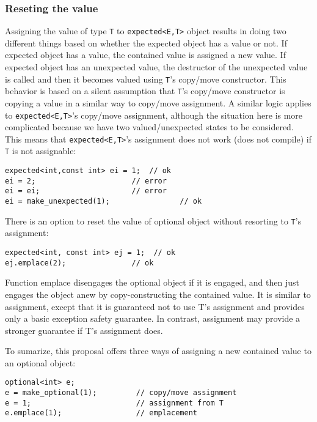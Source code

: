 \documentclass[a4paper,10pt]{article}
\newcommand{\cpp}[1]{\lstinline{#1}}
\begin{document}
\subsubsection{Reseting the value}

Assigning the value of type \cpp{T} to \cpp{expected<E,T>} object results in doing two different things based on whether the expected object has a value or not. If expected object has a value, the contained value is assigned a new value. If expected object has an unexpected value, the destructor of the unexpected value is called and then it becomes valued using \cpp{T}'s copy/move constructor. This behavior is based on a silent assumption that \cpp{T}'s copy/move constructor is copying a value in a similar way to copy/move assignment. A similar logic applies to \cpp{expected<E,T>}'s copy/move assignment, although the situation here is more complicated because we have two valued/unexpected states to be considered. This means that \cpp{expected<E,T>}'s assignment does not work (does not compile) if \cpp{T} is not assignable:

\begin{lstlisting}
expected<int,const int> ei = 1;  // ok
ei = 2;                      // error 
ei = ei;                     // error 
ei = make_unexpected(1);                // ok
\end{lstlisting}

There is an option to reset the value of optional object without resorting to \cpp{T}'s assignment:

\begin{lstlisting}
expected<int, const int> ej = 1;  // ok
ej.emplace(2);               // ok 
\end{lstlisting}

Function emplace disengages the optional object if it is engaged, and then just engages the object anew by copy-constructing the contained value. It is similar to assignment, except that it is guaranteed not to use T's assignment and provides only a basic exception safety guarantee. In contrast, assignment may provide a stronger guarantee if T's assignment does.

To sumarize, this proposal offers three ways of assigning a new contained value to an optional object:

\begin{lstlisting}
optional<int> e;
e = make_optional(1);         // copy/move assignment
e = 1;                        // assignment from T
e.emplace(1);                 // emplacement 
\end{lstlisting}
\end{document}
